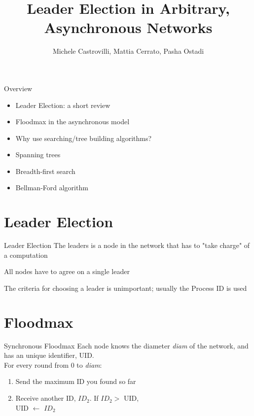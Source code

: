 \documentclass[pdf]{beamer}
\title{Leader Election in Arbitrary, Asynchronous Networks}
\author{Michele Castrovilli, Mattia Cerrato, Pasha Ostadi}
\begin{document}
\Large
\begin{frame}
    \maketitle
\end{frame}

\normalsize
\begin{frame}{Overview}
    \begin{itemize}
        \item Leader Election: a short review
        \item Floodmax in the asynchronous model
        \item Why use searching/tree building algorithms?
        \item Spanning trees
        \item Breadth-first search
        \item Bellman-Ford algorithm 
    \end{itemize}
\end{frame}

\section{Leader Election}
\begin{frame}{Leader Election}
    The leaders is a node in the network that has to "take charge" of a computation
    
    \vspace{12pt}
    \pause
    All nodes have to agree on a single leader
    
    \vspace{12pt}
    \pause
    The criteria for choosing a leader is unimportant; usually the Process ID is used 
\end{frame}

\section{Floodmax}
\begin{frame}{Synchronous Floodmax}
    \vspace{12pt}
    Each node knows the diameter \emph{diam} of the network, and has an unique identifier, UID. \\
    \pause
    For every round from 0 to \emph{diam}:  
    \pause
    \begin{enumerate}
        \item Send the maximum ID you found so far
        \pause
        \item Receive another ID, $ID_{2}$. If $ID_{2} >$ UID, \\
         UID $\leftarrow$ $ID_{2}$ 
    \end{enumerate}
\end{frame}
\end{document}
